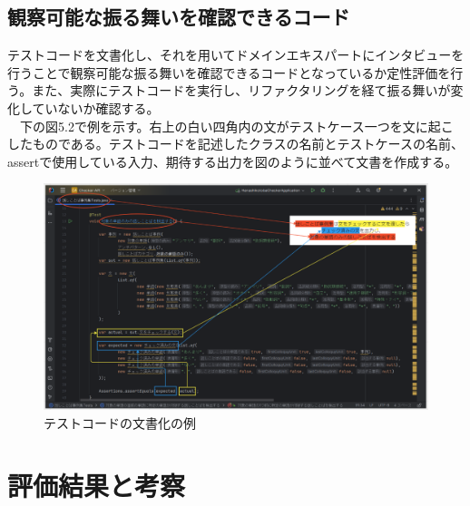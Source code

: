 \documentclass[12pt, a4paper]{jreport}
\begin{document}
\subsection{観察可能な振る舞いを確認できるコード}
テストコードを文書化し、それを用いてドメインエキスパートにインタビューを行うことで観察可能な振る舞いを確認できるコードとなっているか定性評価を行う。また、実際にテストコードを実行し、リファクタリングを経て振る舞いが変化していないか確認する。
\\　下の図5.2で例を示す。右上の白い四角内の文がテストケース一つを文に起こしたものである。テストコードを記述したクラスの名前とテストケースの名前、assertで使用している入力、期待する出力を図のように並べて文書を作成する。
\begin{figure}[H]
\centering
\includegraphics[width=1\linewidth]{image/testDoc.png}
\caption{テストコードの文書化の例}
\label{fig:enter-label}
\end{figure}
\section{評価結果と考察}
\end{document}

